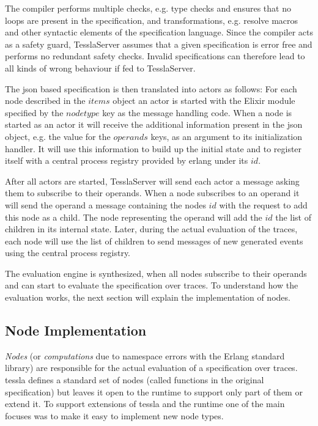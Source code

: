 The compiler performs multiple checks, e.g. type checks and ensures that no loops are present in the specification, and transformations, e.g. resolve macros and other syntactic elements of the specification language.
Since the compiler acts as a safety guard, TesslaServer assumes that a given specification is error free and performs no redundant safety checks.
Invalid specifications can therefore lead to all kinds of wrong behaviour if fed to TesslaServer.

The \gls{json} based specification is then translated into actors as follows: For each node described in the \(\mathit{items}\) object an actor is started with the Elixir module specified by the \(\mathit{nodetype}\) key as the message handling code.
When a node is started as an actor it will receive the additional information present in the \gls{json} object, e.g. the value for the \(\mathit{operands}\) keys, as an argument to its initialization handler.
It will use this information to build up the initial state and to register itself with a central process registry provided by erlang under its \(\mathit{id}\).

After all actors are started, TesslaServer will send each actor a message asking them to subscribe to their operands.
When a node subscribes to an operand it will send the operand a message containing the nodes \(\mathit{id}\) with the request to add this node as a child.
The node representing the operand will add the \(\mathit{id}\) the list of children in its internal state.
Later, during the actual evaluation of the traces, each node will use the list of children to send messages of new generated events using the central process registry.

The evaluation engine is synthesized, when all nodes subscribe to their operands and can start to evaluate the specification over traces.
To understand how the evaluation works, the next section will explain the implementation of nodes.

\subsection{Node Implementation}
\label{sec:implementation:tesslaserver:nodes}

\emph{Nodes} (or \emph{computations} due to namespace errors with the Erlang standard library) are responsible for the actual evaluation of a specification over traces.
\Gls{tessla} defines a standard set of nodes (called functions in the original specification) but leaves it open to the runtime to support only part of them or extend it.
To support extensions of \gls{tessla} and the runtime one of the main focuses was to make it easy to implement new node types.

